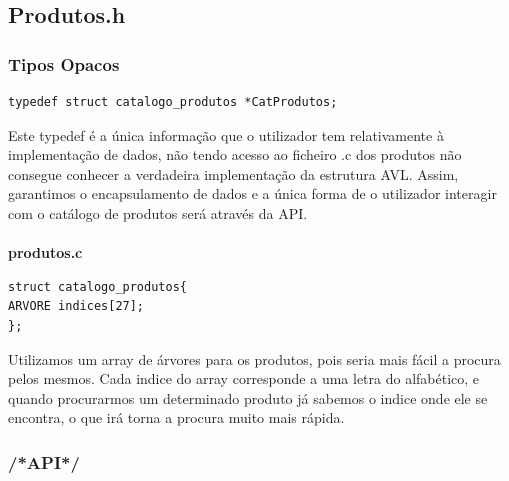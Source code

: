 \subsection{Produtos.h}

\subsubsection{Tipos Opacos}
\begin{verbatim}
typedef struct catalogo_produtos *CatProdutos;
\end{verbatim}

Este typedef é a única informação que o utilizador tem relativamente à implementação de dados, não tendo acesso ao ficheiro .c dos produtos não consegue conhecer a verdadeira implementação da estrutura AVL. Assim, garantimos o encapsulamento de dados e a única forma de o utilizador interagir com o catálogo de produtos será através da API. 

\paragraph{}
\textbf{produtos.c}

\begin{verbatim}
struct catalogo_produtos{
ARVORE indices[27];
};
\end{verbatim}

Utilizamos um array de árvores para os produtos, pois seria mais fácil a procura pelos mesmos. Cada indice do array corresponde a uma letra do alfabético, e quando procurarmos um determinado produto já sabemos o indice onde ele se encontra, o que irá torna a procura muito mais rápida. 

\subsubsection{/*API*/}

